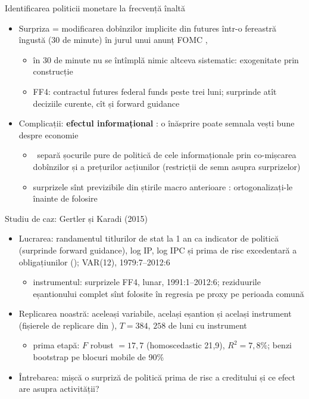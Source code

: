 \begin{frame}{Identificarea politicii monetare la frecvență înaltă}
\itemsize{\small}
\begin{itemize}
    \item Surpriza = modificarea dobînzilor implicite din futures într-o fereastră îngustă (30 de minute) în jurul unui anunț FOMC , 
    \begin{itemize}
        \item în 30 de minute nu se întîmplă nimic altceva sistematic: exogenitate prin construcție
        \item FF4: contractul futures federal funds peste trei luni; surprinde atît deciziile curente, cît și forward guidance 
    \end{itemize}
    \item Complicații: \textbf{efectul informațional} : o înăsprire poate semnala vești bune despre economie
    \begin{itemize}
        \item {}\ separă șocurile pure de politică de cele informaționale prin co-mișcarea dobînzilor și a prețurilor acțiunilor (restricții de semn asupra surprizelor)
        \item surprizele sînt previzibile din știrile macro anterioare : ortogonalizați-le înainte de folosire
    \end{itemize}
\end{itemize}
\end{frame}

\begin{frame}{Studiu de caz: Gertler și Karadi (2015)}
\itemsize{\small}
\begin{itemize}
    \item Lucrarea: randamentul titlurilor de stat la 1 an ca indicator de politică (surprinde forward guidance), log IP, log IPC și prima de risc excedentară a obligațiunilor (); VAR(12), 1979:7--2012:6 
    \begin{itemize}
        \item instrumentul: surprizele FF4, lunar, 1991:1--2012:6; reziduurile eșantionului complet sînt folosite în regresia pe proxy pe perioada comună
    \end{itemize}
    \item Replicarea noastră: aceleași variabile, același eșantion și același instrument (fișierele de replicare din ), $T = 384$, $258$ de luni cu instrument
    \begin{itemize}
        \item prima etapă: $F$ robust $= 17{,}7$ (homoscedastic 21{,}9), $R^2 = 7{,}8\%$; benzi bootstrap pe blocuri mobile de 90\% 
    \end{itemize}
    \item Întrebarea: mișcă o surpriză de politică prima de risc a creditului și ce efect are asupra activității?
\end{itemize}
\end{frame}

